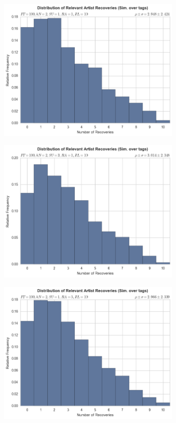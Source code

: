 \documentclass[12pt]{article}
\begin{document}
\begin{figure}[h!]
\centering
  \begin{subfigure}
      \centering
    \includegraphics[height=2.8in]{tags,FT=100,kN=2,SU=1,RA=1,RL=10.png}
  \end{subfigure}
  \begin{subfigure}
      \centering
    \includegraphics[height=2.8in]{tags,FT=100,kN=2,SU=3,RA=1,RL=10.png}
  \end{subfigure}
  \begin{subfigure}
      \centering
    \includegraphics[height=2.8in]{tags,FT=100,kN=2,SU=1,RA=3,RL=10.png}

\end{subfigure}
\end{figure}
\end{document}
